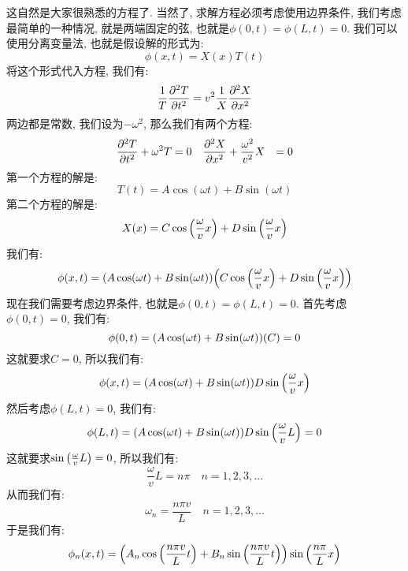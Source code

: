 这自然是大家很熟悉的方程了.
当然了, 求解方程必须考虑使用边界条件, 我们考虑最简单的一种情况, 就是两端固定的弦, 也就是$\phi(0,t) = \phi(L,t) = 0$.
我们可以使用分离变量法, 也就是假设解的形式为:
\begin{equation}
  \phi(x,t) = X(x)T(t)
\end{equation}
将这个形式代入方程, 我们有:
\begin{equation}
  \frac{1}{T} \pdv[2]{T}{t} = v^2 \frac{1}{X} \pdv[2]{X}{x}
\end{equation}
两边都是常数, 我们设为$-\omega^2$, 那么我们有两个方程:
\begin{align}
  \pdv[2]{T}{t} + \omega^2 T &= 0 \quad \pdv[2]{X}{x} + \frac{\omega^2}{v^2} X &= 0
\end{align}
第一个方程的解是:
\begin{equation}
  T(t) = A \cos(\omega t) + B \sin(\omega t)
\end{equation}
第二个方程的解是:
\begin{equation}
  X(x) = C \cos\pqty{\frac{\omega}{v} x } + D \sin\pqty{\frac{\omega}{v} x}
\end{equation}
我们有:
\begin{equation}
  \phi(x,t) = \pqty{A \cos(\omega t) + B \sin(\omega t)} \pqty{C \cos\pqty{\frac{\omega}{v} x} + D \sin\pqty{\frac{\omega}{v} x}}
\end{equation}
现在我们需要考虑边界条件, 也就是$\phi(0,t) = \phi(L,t) = 0$.
首先考虑$\phi(0,t) = 0$, 我们有:
\begin{equation}
  \phi(0,t) = \pqty{A \cos(\omega t) + B \sin(\omega t)} \pqty{C} = 0
\end{equation}
这就要求$C=0$, 所以我们有:
\begin{equation}
  \phi(x,t) = \pqty{A \cos(\omega t) + B \sin(\omega t)} D \sin\pqty{\frac{\omega}{v} x}
\end{equation}
然后考虑$\phi(L,t) = 0$, 我们有:
\begin{equation}
  \phi(L,t) = \pqty{A \cos(\omega t) + B \sin(\omega t)} D \sin\pqty{\frac{\omega}{v} L} = 0
\end{equation}
这就要求$\sin\pqty{\frac{\omega}{v} L} = 0$, 所以我们有:
\begin{equation}
  \frac{\omega}{v} L = n\pi \quad n = 1, 2, 3, \ldots
\end{equation}
从而我们有:
\begin{equation}
  \omega_n = \frac{n\pi v}{L} \quad n = 1, 2, 3, \ldots
\end{equation}
于是我们有:
\begin{equation}
  \phi_n(x,t) = \left( A_n \cos\pqty{\frac{n\pi v}{L} t}  + B_n \sin\pqty{\frac{n\pi v}{L} t} \right) \sin\pqty{\frac{n\pi}{L} x}
\end{equation}
